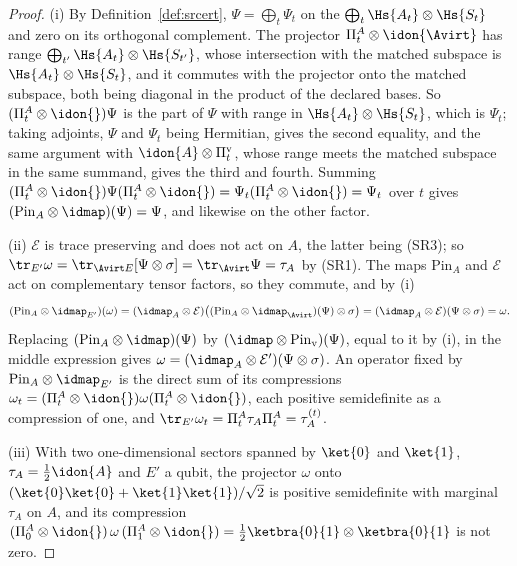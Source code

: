 \begin{proof}
(i) By Definition~\ref{def:srcert}, $\Psi=\bigoplus_t\Psi_t$ on the  $\bigoplus_t\Hs{A_t}\otimes\Hs{S_t}$ and zero on its orthogonal
complement. The projector $\Pi^{A}_t\otimes\idon{\Avirt}$ has range
$\bigoplus_{t'}\Hs{A_t}\otimes\Hs{S_{t'}}$, whose intersection with the
matched subspace is $\Hs{A_t}\otimes\Hs{S_t}$, and it commutes with the
projector onto the matched subspace, both being diagonal in the product of
the declared bases. So $(\Pi^{A}_t\otimes\idon{})\Psi$ is the part of
$\Psi$ with range in $\Hs{A_t}\otimes\Hs{S_t}$, which is $\Psi_t$; taking
adjoints, $\Psi$ and $\Psi_t$ being Hermitian, gives the second equality,
and the same argument with $\idon{A}\otimes\Pi^{\mathrm v}_t$, whose range
meets the matched subspace in the same summand, gives the third and fourth.
Summing $(\Pi^{A}_t\otimes\idon{})\Psi(\Pi^{A}_t\otimes\idon{})
=\Psi_t(\Pi^{A}_t\otimes\idon{})=\Psi_t$ over $t$ gives
$(\mathrm{Pin}_{A}\otimes\idmap)(\Psi)=\Psi$, and likewise on the other
factor.

(ii) $\mathcal{E}$ is trace preserving and does not act on $A$, the latter
being (SR3); so $\tr_{E'}\omega=\tr_{\Avirt E}[\Psi\otimes\sigma]
=\tr_{\Avirt}\Psi=\tau_A$ by (SR1). The maps $\mathrm{Pin}_{A}$ and
$\mathcal{E}$ act on complementary tensor factors, so they commute, and by
(i)
\begin{equation*}
  (\mathrm{Pin}_{A}\otimes\idmap_{E'})(\omega)
  =(\idmap_{A}\otimes\mathcal{E})
   \big((\mathrm{Pin}_{A}\otimes\idmap_{\Avirt})(\Psi)\otimes\sigma\big)
  =(\idmap_{A}\otimes\mathcal{E})(\Psi\otimes\sigma)=\omega .
\end{equation*}
Replacing $(\mathrm{Pin}_{A}\otimes\idmap)(\Psi)$ by
$(\idmap\otimes\mathrm{Pin}_{\mathrm v})(\Psi)$, equal to it by (i), in the
middle expression gives
$\omega=(\idmap_{A}\otimes\mathcal{E}')(\Psi\otimes\sigma)$. An operator
fixed by $\mathrm{Pin}_{A}\otimes\idmap_{E'}$ is the direct sum of its
compressions $\omega_t=(\Pi^{A}_t\otimes\idon{})\omega(\Pi^{A}_t\otimes\idon{})$,
each positive semidefinite as a compression of one, and
$\tr_{E'}\omega_t=\Pi^{A}_t\tau_A\Pi^{A}_t=\tau^{(t)}_A$.

(iii) With two one-dimensional sectors spanned by $\ket{0}$ and $\ket{1}$,
$\tau_A=\tfrac12\idon{A}$ and $E'$ a qubit, the projector $\omega$ onto
$(\ket{0}\ket{0}+\ket{1}\ket{1})/\sqrt2$ is positive semidefinite with
marginal $\tau_A$ on $A$, and its compression
$(\Pi^{A}_0\otimes\idon{})\,\omega\,(\Pi^{A}_1\otimes\idon{})
=\tfrac12\ketbra{0}{1}\otimes\ketbra{0}{1}$ is not zero.
\end{proof}

